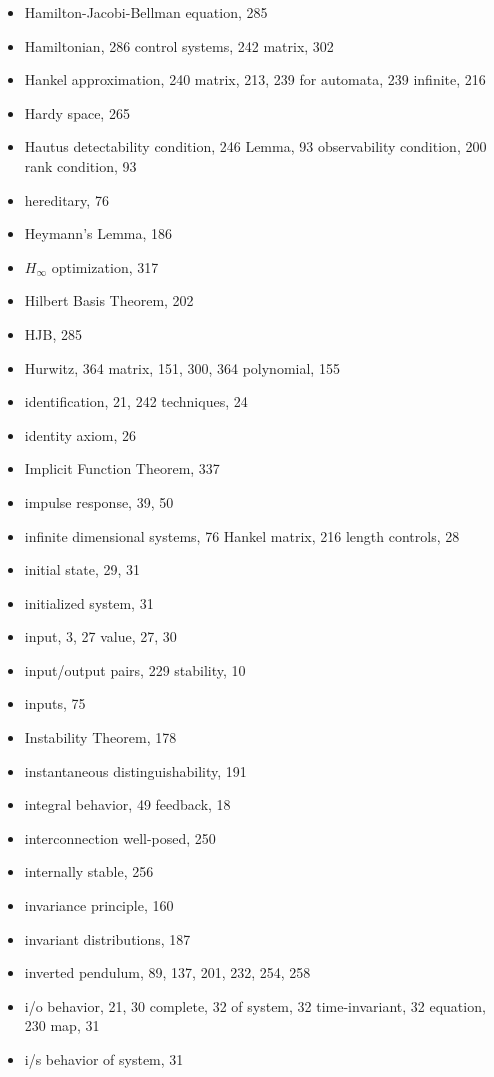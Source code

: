 \begin{itemize}
  \indexspace
  \item Hamilton-Jacobi-Bellman equation, 285
  \item Hamiltonian, 286
    \subitem control systems, 242
    \subitem matrix, 302
  \item Hankel
    \subitem approximation, 240
    \subitem matrix, 213, 239
      \subsubitem for automata, 239
      \subsubitem infinite, 216
  \item Hardy space, 265
  \item Hautus
    \subitem detectability condition, 246
    \subitem Lemma, 93
    \subitem observability condition, 200
    \subitem rank condition, 93
  \item hereditary, 76
  \item Heymann's Lemma, 186
  \item $H_\infty$ optimization, 317
  \item Hilbert Basis Theorem, 202
  \item HJB, 285
  \item Hurwitz, 364
    \subitem matrix, 151, 300, 364
    \subitem polynomial, 155

  \indexspace

  \item identification, 21, 242
    \subitem techniques, 24
  \item identity axiom, 26
  \item Implicit Function Theorem, 337
  \item impulse response, 39, 50
  \item infinite
    \subitem dimensional systems, 76
    \subitem Hankel matrix, 216
    \subitem length controls, 28
  \item initial state, 29, 31
  \item initialized system, 31
  \item input, 3, 27
    \subitem value, 27, 30
  \item input/output
    \subitem pairs, 229
    \subitem stability, 10
  \item inputs, 75
  \item Instability Theorem, 178
  \item instantaneous distinguishability, 191
  \item integral
    \subitem behavior, 49
    \subitem feedback, 18
  \item interconnection
    \subitem well-posed, 250
  \item internally stable, 256
  \item invariance principle, 160
  \item invariant distributions, 187
  \item inverted pendulum, 89, 137, 201, 232, 254, 258
  \item i/o
    \subitem behavior, 21, 30
      \subsubitem complete, 32
      \subsubitem of system, 32
      \subsubitem time-invariant, 32
    \subitem equation, 230
    \subitem map, 31
  \item i/s behavior of system, 31


\end{itemize}
